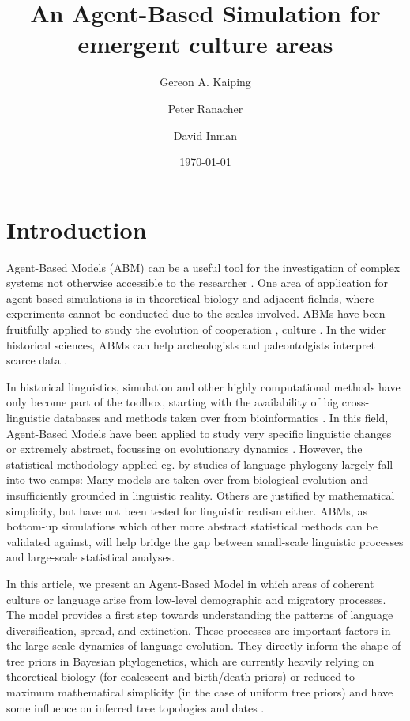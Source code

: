 \documentclass[a4paper,12pt]{scrartcl}
\title{An Agent-Based Simulation for emergent culture areas}
\date{\today}
\author[1]{Gereon A. Kaiping}
\author[1]{Peter Ranacher}
\author[2]{David Inman}
\affil[1]{Geographic Information Science Center, Universität Zürich, CH}
\affil[1]{Institut für vergleichende Sprachwissenschaft, Universität Zürich, CH}
\begin{document}
\maketitle
\section{Introduction}
Agent-Based Models (ABM) \parencite{} can be a useful tool for the investigation
of complex systems not otherwise accessible to the researcher \parencite{}. One
area of application for agent-based simulations is in theoretical biology and
adjacent fielnds, where experiments cannot be conducted due to the scales
involved. ABMs have been fruitfully applied to study the evolution of
cooperation \parencite{}, culture \parencite{}. In the wider historical
sciences, ABMs can help archeologists and paleontolgists interpret scarce data
\parencite{cegielski2016rethinking,barcelo2016simulating}.

In historical linguistics, simulation and other highly computational methods
have only become part of the toolbox, starting with the availability of big
cross-linguistic databases and methods taken over from bioinformatics
\parencite{}. In this field, Agent-Based Models have been applied to study very
specific linguistic changes
\cite{bloem2015agentbased,feltgen2017modeling,grim2011simulating,radulescu2016modelling,vantrijp2016evolution}
or extremely abstract, focussing on evolutionary dynamics
\cite{arita1998evolution,castello2013agentbased,javarone2014competitive}.
However, the statistical methodology applied eg. by studies of language
phylogeny largely fall into two camps: Many models are taken over from
biological evolution and insufficiently grounded in linguistic reality. Others
are justified by mathematical simplicity, but have not been tested for
linguistic realism either. ABMs, as bottom-up simulations which other more
abstract statistical methods can be validated against, will help bridge the gap
between small-scale linguistic processes and large-scale statistical analyses.

In this article, we present an Agent-Based Model in which areas of coherent
culture or language arise from low-level demographic and migratory processes.
The model provides a first step towards understanding the patterns of language
diversification, spread, and extinction. These processes are important factors
in the large-scale dynamics of language evolution. They directly inform the
shape of tree priors in Bayesian phylogenetics, which are currently heavily
relying on theoretical biology (for coalescent and birth/death priors) or
reduced to maximum mathematical simplicity (in the case of uniform tree priors)
and have some influence on inferred tree topologies and dates
\cite{rama2018three}.
\end{document}
